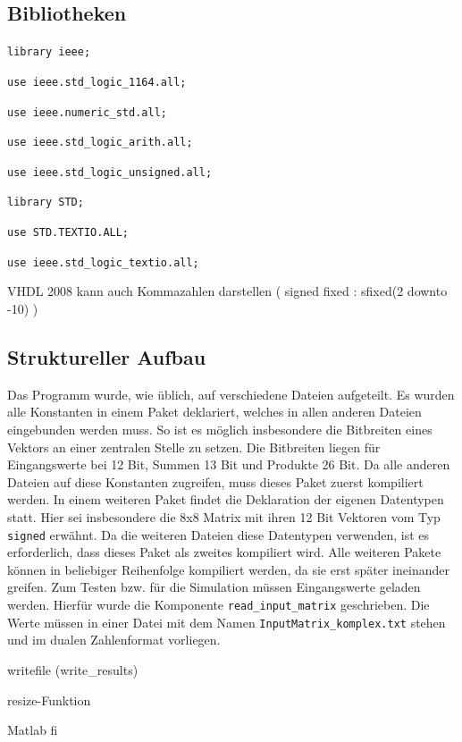  
 
 \subsection{Bibliotheken}
\texttt{library ieee;}

\texttt{use ieee.std\_logic\_1164.all;}

\texttt{use ieee.numeric\_std.all;}

\texttt{use ieee.std\_logic\_arith.all;}

\texttt{use ieee.std\_logic\_unsigned.all;}


\texttt{library STD;}

\texttt{use STD.TEXTIO.ALL;}

\texttt{use ieee.std\_logic\_textio.all;}

VHDL 2008 kann auch Kommazahlen darstellen ( signed fixed : sfixed(2 downto -10) )
 

 
\subsection{Struktureller Aufbau}
 Das Programm wurde, wie üblich, auf verschiedene Dateien aufgeteilt. Es wurden alle Konstanten in einem Paket deklariert, welches in allen anderen Dateien
 eingebunden werden muss. So ist es möglich insbesondere die Bitbreiten eines Vektors an einer zentralen Stelle zu setzen. Die Bitbreiten liegen für 
 Eingangswerte bei 12 Bit, Summen 13 Bit und Produkte 26 Bit. Da alle anderen Dateien auf diese
 Konstanten zugreifen, muss dieses Paket zuerst kompiliert werden. In einem weiteren Paket findet die Deklaration der eigenen Datentypen statt. Hier sei
 insbesondere die 8x8 Matrix mit ihren 12 Bit Vektoren vom Typ \texttt{signed} erwähnt. Da die weiteren Dateien diese Datentypen verwenden, ist es 
 erforderlich, dass dieses Paket als zweites kompiliert wird. Alle weiteren Pakete können in beliebiger Reihenfolge kompiliert werden, da sie erst später ineinander
 greifen. 
 Zum Testen bzw. für die Simulation müssen Eingangswerte geladen werden. Hierfür wurde die Komponente \texttt{read\_input\_matrix} geschrieben. Die Werte müssen
 in einer Datei mit dem Namen \texttt{InputMatrix\_komplex.txt} stehen und im dualen Zahlenformat vorliegen. 
  
 writefile (write\_results)
 
 resize-Funktion
 
 

 Matlab fi
 
